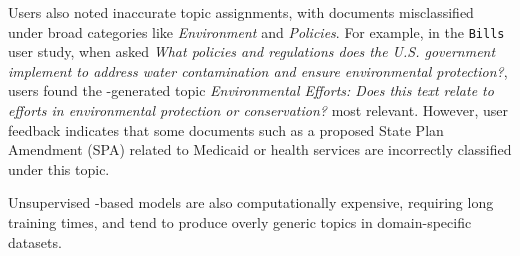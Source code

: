 Users also noted inaccurate topic assignments, with documents misclassified under broad categories like {\it Environment} and {\it Policies}.
%
%
For example, in the \texttt{Bills} user study, when asked \textit{What policies and regulations does the U.S. government implement to address water contamination and ensure environmental protection?}, users found the \lloom{}-generated topic \textit{Environmental Efforts: Does this text relate to efforts in environmental protection or conservation?} most relevant. 
%
However, user feedback indicates that some documents such as a proposed State Plan Amendment (SPA) related to Medicaid or health services are incorrectly classified under this topic. 

%
%
%
Unsupervised \mm{}-based models are also computationally expensive, requiring long training
times, and tend to produce overly generic topics in domain-specific datasets. 

